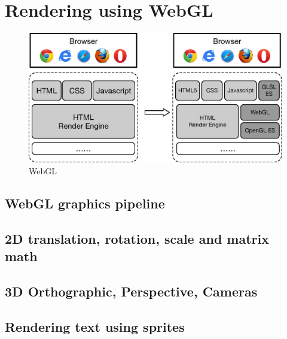 \chapter{Rendering using WebGL}

\begin{figure}[htb]
  \centering
  \includegraphics[width=.9\textwidth]{Assets/WebGL_HTML5}
  \caption{WebGL}
  \label{fig:ZF_MMSE_detector}
\end{figure}

\section{WebGL graphics pipeline}
\section{2D translation, rotation, scale and matrix math}
\section{3D Orthographic, Perspective, Cameras}
\section{Rendering text using sprites}